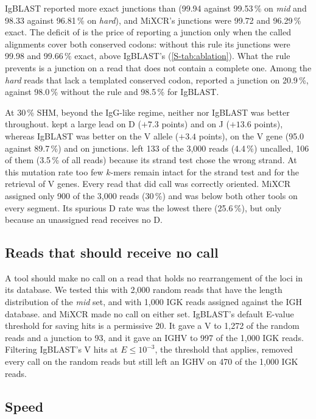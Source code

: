 \documentclass[11pt,a4paper]{article}
\begin{document}
IgBLAST reported more exact junctions than \swig{} (99.94 against 99.53\,\%
on \emph{mid} and 98.33 against 96.81\,\% on \emph{hard}), and MiXCR's
junctions were 99.72 and 96.29\,\% exact. The deficit of \swig{} is the
price of reporting a junction only when the called alignments cover both
conserved codons: without this rule its junctions were 99.98 and 99.66\,\%
exact, above IgBLAST's (\cref{S-tab:ablation}). What the rule prevents is a junction on a read that
does not contain a complete one. Among the \emph{hard} reads that lack a
templated conserved codon, \swig{} reported a junction on 20.9\,\%, against
98.0\,\% without the rule and 98.5\,\% for IgBLAST.

At 30\,\% SHM, beyond the IgG-like regime, neither \swig{} nor IgBLAST was
better throughout. \swig{} kept a large lead on D ($+7.3$ points) and on J
($+13.6$ points), whereas IgBLAST was better on the V allele ($+3.4$
points), on the V gene (95.0 against 89.7\,\%) and on junctions. \swig{}
left 133 of the 3,000 reads (4.4\,\%) uncalled, 106 of them (3.5\,\% of all
reads) because its strand test chose the wrong strand. At this mutation rate
too few $k$-mers remain intact for the strand test and for the retrieval of
V genes. Every read that \swig{} did call was correctly oriented. MiXCR
assigned only 900 of the 3,000 reads (30\,\%) and was below both other tools
on every segment. Its spurious D rate was the lowest there (25.6\,\%), but
only because an unassigned read receives no D.

\subsection{Reads that should receive no call}
\label{sec:specificity}

A tool should make no call on a read that holds no rearrangement of the loci
in its database. We tested this with 2,000 random reads that have the length
distribution of the \emph{mid} set, and with 1,000 IGK reads assigned
against the IGH database. \swig{} and MiXCR made no call on either set.
IgBLAST's default E-value threshold for saving hits is a permissive 20. It
gave a V to 1,272 of the random reads and a junction to 93, and it gave an
IGHV to 997 of the 1,000 IGK reads. Filtering IgBLAST's V hits at
$E\le10^{-3}$, the threshold that \swig{} applies, removed every call on the
random reads but still left an IGHV on 470 of the 1,000 IGK reads.

\subsection{Speed}
\label{sec:speed}
\end{document}
